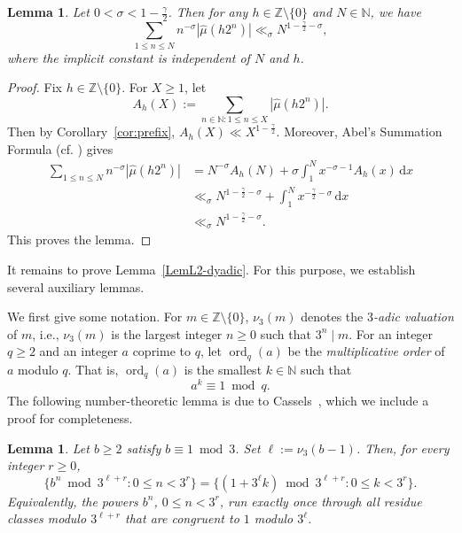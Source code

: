 \documentclass[10pt,a4paper]{amsart}
\numberwithin{equation}{section} %
\DeclareMathOperator{\ord}{ord}
\newtheorem{lem}[thm]{Lemma}
\newcommand{\N}{\mathbb{N}}
\newcommand{\Z}{\mathbb{Z}}
\begin{document}
\begin{lem}\label{lem:weightedL1}
	Let  $0< \sigma<1-\frac{\gamma}{2}$.  Then for any $h\in\Z\setminus\{0\}$ and  $N\in\N$, we have
\begin{equation*}\label{eq:weighted-L1}
		\sum_{1\leq n\leq N}n^{- \sigma}|\widehat\mu(h2^n)|
		\ll_{\sigma} N^{1-\frac{\gamma}{2}-\sigma},
	\end{equation*}
	where the implicit constant is independent of $N$ and $h$. 
\end{lem}

\begin{proof}
Fix $h\in\Z\setminus\{0\}$. For $X\geq1$, let
\[A_h(X):=\sum_{n\in\N: 1\leq n\leq X}|\widehat\mu(h2^n)|.\]
Then by  Corollary~\ref{cor:prefix}, $A_h(X)\ll X^{1-\frac{\gamma}{2}}$. Moreover,  Abel’s Summation Formula (cf. \cite[Theorem 4.10]{Pongsriiam}) gives
\begin{align*}
		\sum_{1\leq n\leq N}n^{-\sigma}|\widehat\mu(h2^n)|
		&=N^{-\sigma}A_h(N)
		+\sigma\int_1^N x^{-\sigma-1}A_h(x)\, \mathrm{d}x \\
		&\ll_{\sigma} N^{1-\frac{\gamma}{2}-\sigma}
		+\int_1^N x^{-\frac{\gamma}{2}-\sigma}\, \mathrm{d}x\\
		&\ll_{\sigma} N^{1-\frac{\gamma}{2}-\sigma}.
\end{align*}
This proves the lemma.
\end{proof}

It remains to prove Lemma~\ref{LemL2-dyadic}.
For this purpose, we  establish several auxiliary lemmas. 

We first give some notation.  For $m\in\Z\setminus\{0\}$,  $\nu_3(m)$ denotes the {\it $3$-adic valuation} of $m$, i.e., $\nu_3(m)$ is the largest integer $n\geq 0$ such that $3^n\mid m$.  For an integer $q\geq 2$ and an integer $a$ coprime to $q$, let $\ord_q(a)$
be the {\it multiplicative order} of $a$ modulo $q$. That is, $\ord_{q}(a)$ is the smallest $k\in\N$ such that 
\[a^{k}\equiv 1\bmod q.\] The following number-theoretic lemma is due to Cassels~\cite[Lemma 2]{Cassels59}, which we include a proof for completeness.

\begin{lem}\label{lemmod3lr}
Let $b\ge 2$ satisfy $b\equiv 1\bmod{3}$. Set $\ell := \nu_3(b-1)$.
	Then, for every integer $r\ge 0$,
\begin{equation}\label{eqbn1to3r}
		\{b^n \bmod 3^{\ell+r}: 0\leq n<3^r\}
		=
		\{(1+3^{\ell}k)\bmod 3^{\ell+r}: 0\leq k<3^{r}\}.
	\end{equation}
	Equivalently, the powers $b^n$, $0\leq n<3^r$, run exactly once through all residue classes modulo $3^{\ell+r}$ that are congruent to $1$ modulo $3^\ell$.
\end{lem}
\end{document}
